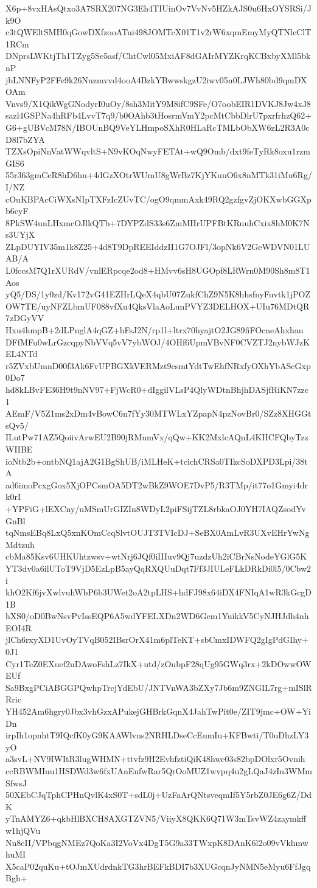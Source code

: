 X6p+8vxHAsQtxo3A7SRX207NG3Eh4TIUinOv7VvNv5HZkAJS0u6HxOYSRSi/Jk9O
c3tQWEltSMH0qGowDXfzooATui498JOMTcX01T1v2rW6xqmEmyMyQTNleClT1RCm
DNprsLWKtjTh1TZyg5Se5asf/ChtCwl05MxiAF8dGAIrMYZKrqKCBxbyXMl5bknP
jbLNNFyP2FFe9k26Nuzmvvd4ooA4BzkYBwwskgzU2iwv05n0LJWh80bd9qmDXOAm
Vnvs9/X1QikWgGNodyrI0uOy/8sh3MitY9M8ifC9SFe/O7oobEIR1DVKJ8Jw4xJ8
sazl4GSPNa4hRFb4LvvT7q9/b0OAhb3tHosrmVmY2pcMtCbbDlrU7pxrfrhzQ62+
G6+gUBVcM78N/IBOUnBQ9VeYLHmpoSXhR0HLaRcTMLbObXW6zL2R3A0cD8l7bZYA
TZXsOpiNnVatWWqvltS+N9vKOqNwyFETAt+wQ9Omb/dxt9feTyRk8oxu1rzmGIS6
55r363gmCeR8hD6hn+4dGzXOtrWUmU8gWrBz7KjYKuuO6x8nMTk31iMu6Rg/I/NZ
cOuKBPAcCiWXsNIpTXFzIcZUvTC/ogO9qmmAxk49RQ2gzfgvZjOKXwbGGXpb6cyF
8PkSW4unLHxmcOJlkQTb+7DYPZdS33s6ZmMHrUPFBtKRuuhCxix8hM0K7Ns3UYjX
ZLpDUYIV35m1k8Z25+4d8T9DpREEIddzII1G7OJFl/3opNk6V2GeWDVN01LUAB/A
L0fccsM7Q1rXURdV/vnlERpcqe2od8+HMvv6sH8UGOpf8LRWrn0M90Sh8m8T1Aos
yQ5/DS/1y0zd/Kv172vG41EZHrLQeX4qbU07ZukfChZ9N5K8hhsfnyFuvtk1jPOZ
OW7TE/uyNFZLbmUF088vfXu4QksVlaAoLunPVYZ3DELHOX+UIu76MDtQR7zDGyVV
Hxu4hmpB+2dLPnglA4qGZ+hFsJ2N/rp1l+ltrx70hyajtO2JG89fiFOcneAhxhau
DFfMFu0wLrGzcqpyNbVVq5vV7ybWOJ/4OHf6UpmVBvNF0CVZTJ2nybWJzKEL4NTd
r5ZVxbUmnD00f3Ak6FvUPBGXkVERMzt9csmtYdtTwEhfNRxfyOXhYbAScGxp0Do7
hd8kLBvFE36H9t9nNV97+FjWcR0+dIggilVLsP4QlyWDtnBhjhDASjfRiKN7zzc1
AEmF/V5Z1ms2xDm4vBowC6n7fYy30MTWLxYZpapN4pzNovBr0/SZz8XHGGtsQv5/
ILutPw71AZ5QoiivArwEU2B90jRMumVx/qQw+KK2MxlcAQnL4KHCFQbyTzzWIIBE
ioNtb2b+ontbNQ1ajA2G1BgShUB/iMLHeK+tcichCRSa0TIkcSoDXPD3Lpi/38tA
ad6imoPcxgGox5XjOPCsmOA5DT2wBkZ9WOE7DvP5/R3TMp/it77o1Gmyi4drk0rI
+YPFiG+lEXCny/uMSmUrGIZIn8WDyL2piFSijTZL8rbkaOJ0YH7IAQZsodYvGnBl
tqNmsEBq8LxQ5xnKOmCcqSlvtOUJT3TVIcDJ+SeBX0AmLvR3UXvEHrYwNgMdtzuh
cbMa85Ksv6UHKUhtzwsv+wtNrj6JQf0iIIIuv9Qj7uzdzUh2iCBrNsNodeYGlG5K
YT3dv0a6ilUToT9VjD5EzLpB5ayQqRXQUuDqt7Ff3JIULeFLkDRkDi0l5/0Cbw2i
khO2Kf6jvXwlvuhWbP6b3UWet2oA2tpLHS+hdFJ98x64iDX4FNIqA1wR3kGcgD1B
hXS0/oD0BwNsvPvIssEQP6A5wdYFELXDn2WD6Gcm1YuikkV5CyNJHJdh4nhEOI4R
jlCh6rxyXD1UvOyTVqB052IBsrOrX41m6plTeKT+sbCmxIDWFQ2gIgPdGIhy+0J1
Cyr1TeZ0EXuef2uDAwoFshLz7IkX+utd/zOubpF28qUg95GWq3rx+2kDOwwOWEUf
Sa9BxgPCiABGGPQwhpTrcjYdEbU/JNTVnWA3bZXy7Jb6m9ZNGIL7rg+mISlRRric
YH452Am6hgry0Jbx3vhGzxAPukejGHBrkGqnX4JahTwPit0e/ZIT9jmc+OW+YiDn
irpIh1opnhtT9IQcfK0yG9KAAWlvns2NRHLDseCcEumIu+KFBwti/T0uDhzLY3yO
a3svL+NV9IWItR3lugWHMN+ttvfz9H2EvhfztiQiK48hwc03s82bpDOlxr5Ovnih
ccRBWMIuu1HSDWd3w6fxUAnEufwRar5QrOoMUZ1wvpq4u2gLQaJ4zIn3WMmSfwsJ
50XEbCJqTphCPHnQvlK4xS0T+sdL0j+UzFaArQNtsveqmIf5Y5rbZ0JE6g6Z/DdK
yTnAMYZ6+qkbHlBXCH8AXGTZVN5/ViiyX8QKK6Q71W3mTsvWZ4zaymkffw1hjQVu
Nn8eII/VPbqgNMEz7QoKa3I2VoVx4DgT5G9a33TWxpK8DAnK6l2o09vVkhmwhuMI
X5caP02quKu+tOJmXUdrdnkTG3hrBEFkBDI7b3XUGcqnJyNMN5eMyu6FfJgqBgh+
